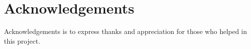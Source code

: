 
\chapter*{\centering Acknowledgements}
\begin{spacing}{1.5}
\setlength{\parskip}{0.3in}

Acknowledgements is to express thanks and appreciation for those who helped in this project.

\end{spacing}
\newpage
